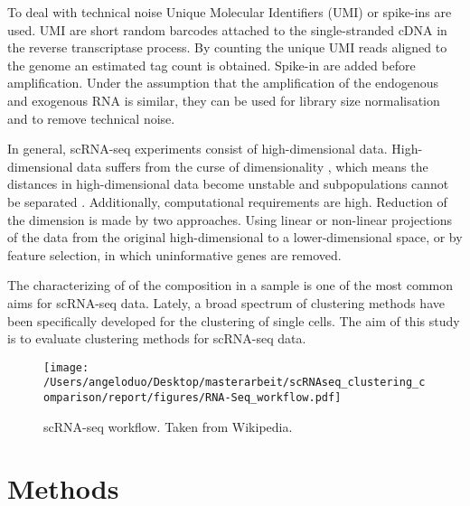 \documentclass[12pt, a4paper]{article}\usepackage[]{graphicx}\usepackage[]{color}
\begin{document}
To deal with technical noise Unique Molecular Identifiers (UMI) or spike-ins are used. UMI are short random barcodes attached to the single-stranded cDNA in the reverse transcriptase process. By counting the unique UMI reads aligned to the genome an estimated tag count is obtained. Spike-in are added before amplification. Under the assumption that the amplification of the endogenous and exogenous RNA is similar, they can be used for library size normalisation and to remove technical noise. 

In general, scRNA-seq experiments consist of high-dimensional data. High-dimensional data suffers from the curse of dimensionality \citep{wagner2016revealing}, which means the distances in high-dimensional data become unstable and subpopulations cannot be separated \citep{andrews2017identifying}. Additionally, computational requirements are high. Reduction of the dimension is made by two approaches. Using linear or non-linear projections of the data from the original high-dimensional to a lower-dimensional space, or by feature selection, in which uninformative genes are removed.

The characterizing of of the composition in a sample is one of the most common aims for scRNA-seq data. Lately, a broad spectrum of clustering methods have been specifically developed for the clustering of single cells. The aim of this study is to evaluate clustering methods for scRNA-seq data.
\begin{figure}[!h]
\begin{center}
\texttt{[image: /Users/angeloduo/Desktop/masterarbeit/scRNAseq\_clustering\_comparison/report/figures/RNA-Seq\_workflow.pdf]}
\caption{scRNA-seq workflow. Taken from Wikipedia. }
\label{fig:flow}
\end{center}
\end{figure}
\clearpage
\newpage

\section{Methods}
\end{document}
